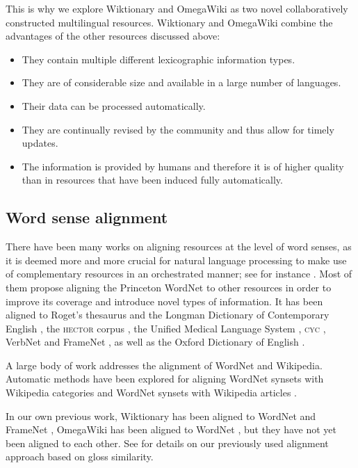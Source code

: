 \documentclass[output=paper]{LSP/langsci}
\begin{document}
This is why we explore Wiktionary and OmegaWiki as two novel collaboratively constructed multilingual resources. 
Wiktionary and OmegaWiki combine the advantages of the other resources discussed above:

\begin{itemize}
  \item They contain multiple different lexicographic information types.
  \item They are of considerable size and available in a large number of languages.
  \item Their data can be processed automatically.
  \item They are continually revised by the community and thus allow for timely updates. 
  \item The information is provided by humans and therefore it is of higher quality than in resources that have been induced fully automatically. 
\end{itemize}


\noindent

\subsection{Word sense alignment}

There have been many works on aligning resources at the level of word senses,  as it is deemed more and more crucial for natural language processing to make use of complementary resources in an orchestrated manner; see for instance \citep{Shi05,Ponzetto10}.
Most of them propose aligning the Princeton WordNet to other resources in order to improve its coverage and introduce novel types of information. It has been aligned to Roget's thesaurus and the Longman Dictionary of Contemporary English \citep{Kwong98}, the \textsc{hector} corpus \citep{Litkowski99}, the Unified Medical Language System \citep{Burgun01}, \textsc{cyc} \citep{Reed02}, VerbNet and FrameNet \citep{Shi05}, as well as the Oxford Dictionary of English \citep{Navigli06}.

A large body of work addresses the alignment of WordNet and Wikipedia. Automatic methods have been explored for aligning WordNet synsets with Wikipe\-dia categories \citep{Toral09,Ponzetto09} and WordNet synsets with Wikipedia articles \citep{Ruiz05,Melo10,Navigli10,Niemann2011}.

In our own previous work, Wiktionary has been aligned to WordNet and FrameNet \citep{Meyer11a, TUD-CS-2013-0057, TUD-CS-2013-0082}, OmegaWiki has been aligned to WordNet \citep{Gurevych12, TUD-CS-2013-0057},  but they have not yet been aligned to each other. See  for details on our previously used alignment approach based on gloss similarity.
\end{document}

